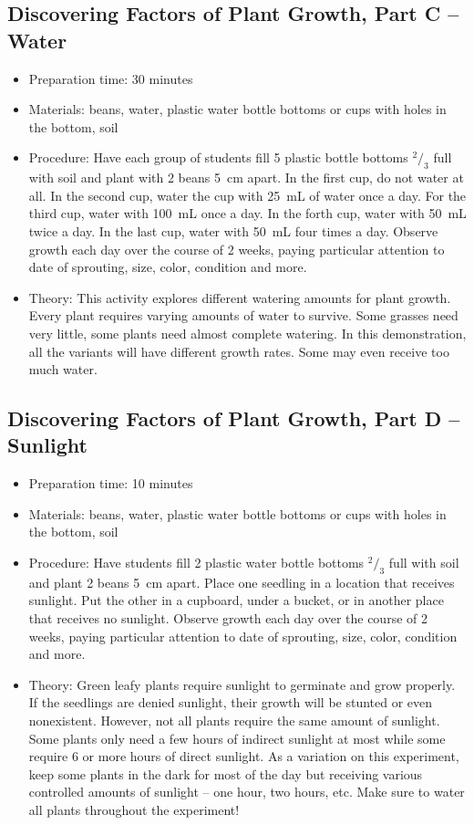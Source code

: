 \subsection{Discovering Factors of Plant Growth, Part C -- Water}
\begin{itemize}
\item{Preparation time: 30 minutes}
\item{Materials: beans, water, plastic water bottle bottoms or cups with holes in the bottom, soil}
\item{Procedure: Have each group of students fill 5 plastic bottle bottoms $^2/_3$ full with soil and plant with 2 beans 5~cm apart. In the first cup, do not water at all. In the second cup, water the cup with 25~mL of water once a day. For the third cup, water with 100~mL once a day. In the forth cup, water with 50~mL twice a day. In the last cup, water with 50~mL four times a day. Observe growth each day over the course of 2 weeks, paying particular attention to date of sprouting, size, color, condition and more.}
\item{Theory: This activity explores different watering amounts for plant growth. Every plant requires varying amounts of water to survive. Some grasses need very little, some plants need almost complete watering. In this demonstration, all the variants will have different growth rates. Some may even receive too much water.}
\end{itemize}

\subsection{Discovering Factors of Plant Growth, Part D -- Sunlight}
\begin{itemize}
\item{Preparation time: 10 minutes}
\item{Materials: beans, water, plastic water bottle bottoms or cups with holes in the bottom, soil}
\item{Procedure: Have students fill 2 plastic water bottle bottoms $^2/_3$ full with soil and plant 2 beans 5~cm apart. Place one seedling in a location that receives sunlight. Put the other in a cupboard, under a bucket, or in another place that receives no sunlight. Observe growth each day over the course of 2 weeks, paying particular attention to date of sprouting, size, color, condition and more.}
\item{Theory: Green leafy plants require sunlight to germinate and grow properly. If the seedlings are denied sunlight, their growth will be stunted or even nonexistent. However, not all plants require the same amount of sunlight. Some plants only need a few hours of indirect sunlight at most while some require 6 or more hours of direct sunlight. As a variation on this experiment, keep some plants in the dark for most of the day but receiving various controlled amounts of sunlight -- one hour, two hours, etc. Make sure to water all plants throughout the experiment!}
\end{itemize}

